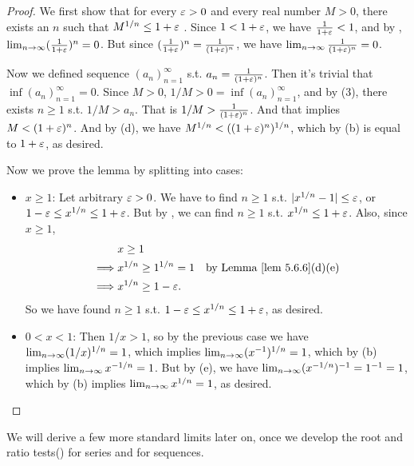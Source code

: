 \begin{proof}
We first show that for every \(\varepsilon > 0\) and every real number \(M > 0\), there exists an \(n\) such that \(M^{1/n} \le 1 + \varepsilon\) .
Since \(1 < 1 + \varepsilon\), we have \(\frac1{1 + \varepsilon} < 1\), and by , \(\lim_{n \to \infty} (\frac1{1 + \varepsilon})^n = 0\).
But since \((\frac1{1 + \varepsilon})^n = \frac1{(1 + \varepsilon)^n}\), we have \(\lim_{n \to \infty} \frac1{(1 + \varepsilon)^n} = 0\).

Now we defined sequence \((a_n)_{n = 1}^{\infty}\) s.t. \(a_n = \frac1{(1 + \varepsilon)^n}\).
Then it's trivial that \(\inf(a_n)_{n = 1}^{\infty} = 0\).
Since \(M > 0\), \(1/M > 0 = \inf(a_n)_{n = 1}^{\infty}\), and by (3), there exists \(n \ge 1\) s.t. \(1/M > a_n\).
That is \(1/M > \frac1{(1 + \varepsilon)^n}\).
And that implies \(M < (1 + \varepsilon)^n\).
And by (d), we have \(M^{1/n} < ((1 + \varepsilon)^n)^{1/n}\), which by (b) is equal to \(1 + \varepsilon\), as desired.

Now we prove the lemma by splitting into cases:
\begin{itemize}
\item \(x \ge 1\):
    Let arbitrary \(\varepsilon > 0\).
    We have to find \(n \ge 1\) s.t. \(\lvert x^{1/n} - 1\rvert \le \varepsilon\), or \(1 - \varepsilon \le x^{1/n} \le 1 + \varepsilon\).
    But by , we can find \(n \ge 1\) s.t. \(x^{1/n} \le 1 + \varepsilon\).
    Also, since \(x \ge 1\),
    \begin{align*}
                 & x \ge 1 \\
        \implies & x^{1/n} \ge 1^{1/n} = 1 & \text{by \LEM{5.6.6}(d)(e)} \\
        \implies & x^{1/n} \ge 1 - \varE.
    \end{align*}
    So we have found \(n \ge 1\) s.t. \(1 - \varepsilon \le x^{1/n} \le 1 + \varepsilon\), as desired.
\item \(0 < x < 1\):
    Then \(1/x > 1\), so by the previous case we have \(\lim_{n \to \infty} (1/x)^{1/n} = 1\),
    which implies \(\lim_{n \to \infty} (x^{-1})^{1/n} = 1\), which by (b) implies \(\lim_{n \to \infty} x^{-1/n} = 1\).
    But by (e), we have \(\lim_{n \to \infty} (x^{-1/n})^{-1} = 1^{-1} = 1\), which by (b) implies \(\lim_{n \to \infty} x^{1/n} = 1\), as desired.
\end{itemize}
\end{proof}

\begin{note}
We will derive a few more standard limits later on, once we develop the root and ratio tests() for series and for sequences.
\end{note}

